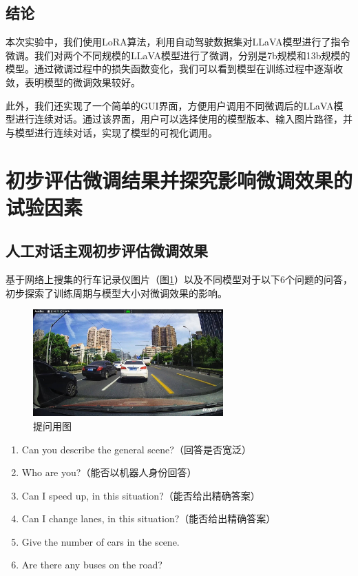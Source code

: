 \documentclass[
    linespread = 1.25
]{ctexart}
\begin{document}
\subsection{结论}

本次实验中，我们使用LoRA算法，利用自动驾驶数据集对LLaVA模型进行了指令微调。我们对两个不同规模的LLaVA模型进行了微调，分别是7b规模和13b规模的模型。通过微调过程中的损失函数变化，我们可以看到模型在训练过程中逐渐收敛，表明模型的微调效果较好。

此外，我们还实现了一个简单的GUI界面，方便用户调用不同微调后的LLaVA模型进行连续对话。通过该界面，用户可以选择使用的模型版本、输入图片路径，并与模型进行连续对话，实现了模型的可视化调用。

\section{初步评估微调结果并探究影响微调效果的试验因素}
\subsection{人工对话主观初步评估微调效果}

基于网络上搜集的行车记录仪图片（图\ref{R.jpg}）以及不同模型对于以下6个问题的问答，初步探索了训练周期与模型大小对微调效果的影响。

\begin{figure}[ht] 
    \centering 
    \includegraphics[width=0.65\textwidth]{R.jpg}
    \caption{提问用图} 
    \label{R.jpg} %
\end{figure}

\begin{enumerate} 
    \item Can you describe the general scene?（回答是否宽泛）
    \item Who are you?（能否以机器人身份回答）
    \item Can I speed up, in this situation?（能否给出精确答案）
    \item Can I change lanes, in this situation?（能否给出精确答案）
    \item Give the number of cars in the scene.
    \item Are there any buses on the road?
\end{enumerate}
\end{document}
